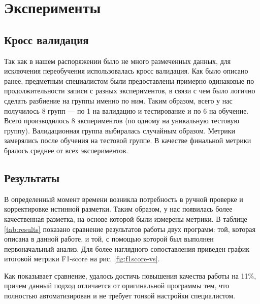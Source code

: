 \chapter{Эксперименты}

\section{Кросс валидация}
Так как в нашем распоряжении было не много размеченных данных, для исключения
переобучения использовалась кросс валидация. Как было описано ранее, предметным
специалистом были предоставлены примерно одинаковые по продолжительности записи
с разных экспериментов, в связи с чем было логично сделать разбиение на группы
именно по ним. Таким образом, всего у нас получилось 8 групп --- по 1 на
валидацию и тестирование и по 6 на обучение. Всего производилось 8
экспериментов (по одному на уникальную тестовую группу). Валидационная группа
выбиралась случайным образом. Метрики замерялись после обучения на тестовой
группе. В качестве финальной метрики бралось среднее от всех экспериментов.

\section{Результаты}

В определенный момент времени возникла потребность в ручной проверке и
корректировке истинной разметки. Таким образом, у нас появилась более
качественная разметка, на основе которой были измерены метрики. В таблице
\ref{tab:results} показано сравнение результатов работы двух программ: той,
которая описана в данной работе, и той, с помощью которой был выполнен
первоначальный анализ. Для более наглядного сопоставления приведен график
итоговой метрики F1-score на рис. \ref{fig:f1score-vs}.

Как показывает сравнение, удалось достичь повышения качества работы на 11\%,
причем данный подход отличается от оригинальной программы тем, что полностью
автоматизирован и не требует тонкой настройки специалистом.

